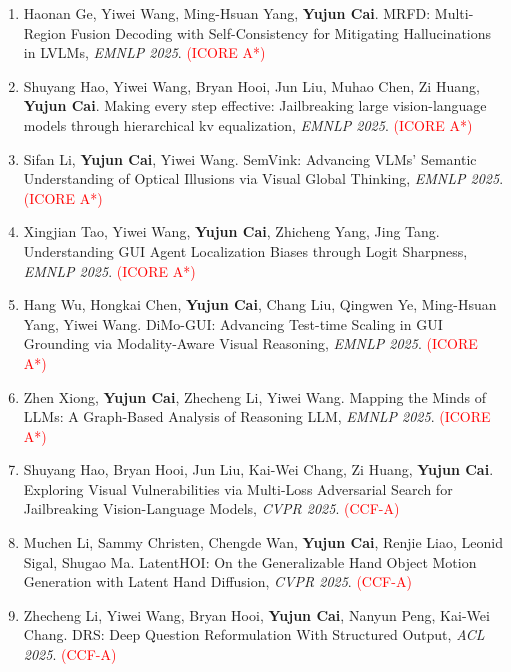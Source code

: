 \documentclass[UTF8,a4paper,11pt,fontset=fandol]{ctexart}
\begin{document}
\begin{enumerate}
\item Haonan Ge, Yiwei Wang, Ming-Hsuan Yang, \textbf{Yujun Cai}. MRFD: Multi-Region Fusion Decoding with Self-Consistency for Mitigating Hallucinations in LVLMs, \textit{EMNLP 2025}. \textcolor{red}{(ICORE A*)}

\item Shuyang Hao, Yiwei Wang, Bryan Hooi, Jun Liu, Muhao Chen, Zi Huang, \textbf{Yujun Cai}. Making every step effective: Jailbreaking large vision-language models through hierarchical kv equalization, \textit{EMNLP 2025}. \textcolor{red}{(ICORE A*)}

\item Sifan Li, \textbf{Yujun Cai}, Yiwei Wang. SemVink: Advancing VLMs' Semantic Understanding of Optical Illusions via Visual Global Thinking, \textit{EMNLP 2025}. \textcolor{red}{(ICORE A*)}

\item Xingjian Tao, Yiwei Wang, \textbf{Yujun Cai}, Zhicheng Yang, Jing Tang. Understanding GUI Agent Localization Biases through Logit Sharpness, \textit{EMNLP 2025}. \textcolor{red}{(ICORE A*)}

\item Hang Wu, Hongkai Chen, \textbf{Yujun Cai}, Chang Liu, Qingwen Ye, Ming-Hsuan Yang, Yiwei Wang. DiMo-GUI: Advancing Test-time Scaling in GUI Grounding via Modality-Aware Visual Reasoning, \textit{EMNLP 2025}. \textcolor{red}{(ICORE A*)}

\item Zhen Xiong, \textbf{Yujun Cai}, Zhecheng Li, Yiwei Wang. Mapping the Minds of LLMs: A Graph-Based Analysis of Reasoning LLM, \textit{EMNLP 2025}. \textcolor{red}{(ICORE A*)}

\item Shuyang Hao, Bryan Hooi, Jun Liu, Kai-Wei Chang, Zi Huang, \textbf{Yujun Cai}. Exploring Visual Vulnerabilities via Multi-Loss Adversarial Search for Jailbreaking Vision-Language Models, \textit{CVPR 2025}. \textcolor{red}{(CCF-A)}

\item Muchen Li, Sammy Christen, Chengde Wan, \textbf{Yujun Cai}, Renjie  Liao, Leonid Sigal, Shugao Ma. LatentHOI: On the Generalizable Hand Object Motion Generation with Latent Hand Diffusion, \textit{CVPR 2025}. \textcolor{red}{(CCF-A)}

\item Zhecheng Li, Yiwei Wang, Bryan Hooi, \textbf{Yujun Cai}, Nanyun Peng, Kai-Wei Chang. DRS: Deep Question Reformulation With Structured Output, \textit{ACL 2025}. \textcolor{red}{(CCF-A)}


\end{enumerate}
\end{document}
